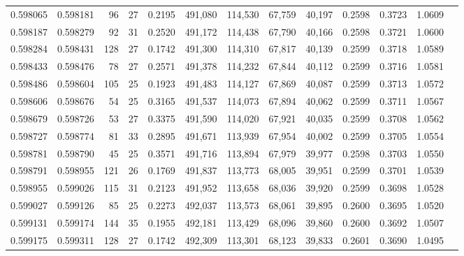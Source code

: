 \begin{tabular}{rrrrrrrrrrrrr}
0.598065 & 0.598181 &  96 &  27 &                                     0.2195 & 491,080 & 114,530 &  67,759 &  40,197 & 0.2598 & 0.3723 & 1.0609 \\
0.598187 & 0.598279 &  92 &  31 &                                     0.2520 & 491,172 & 114,438 &  67,790 &  40,166 & 0.2598 & 0.3721 & 1.0600 \\
0.598284 & 0.598431 & 128 &  27 &                                     0.1742 & 491,300 & 114,310 &  67,817 &  40,139 & 0.2599 & 0.3718 & 1.0589 \\
0.598433 & 0.598476 &  78 &  27 &                                     0.2571 & 491,378 & 114,232 &  67,844 &  40,112 & 0.2599 & 0.3716 & 1.0581 \\
0.598486 & 0.598604 & 105 &  25 &                                     0.1923 & 491,483 & 114,127 &  67,869 &  40,087 & 0.2599 & 0.3713 & 1.0572 \\
0.598606 & 0.598676 &  54 &  25 &                                     0.3165 & 491,537 & 114,073 &  67,894 &  40,062 & 0.2599 & 0.3711 & 1.0567 \\
0.598679 & 0.598726 &  53 &  27 &                                     0.3375 & 491,590 & 114,020 &  67,921 &  40,035 & 0.2599 & 0.3708 & 1.0562 \\
0.598727 & 0.598774 &  81 &  33 &                                     0.2895 & 491,671 & 113,939 &  67,954 &  40,002 & 0.2599 & 0.3705 & 1.0554 \\
0.598781 & 0.598790 &  45 &  25 &                                     0.3571 & 491,716 & 113,894 &  67,979 &  39,977 & 0.2598 & 0.3703 & 1.0550 \\
0.598791 & 0.598955 & 121 &  26 &                                     0.1769 & 491,837 & 113,773 &  68,005 &  39,951 & 0.2599 & 0.3701 & 1.0539 \\
0.598955 & 0.599026 & 115 &  31 &                                     0.2123 & 491,952 & 113,658 &  68,036 &  39,920 & 0.2599 & 0.3698 & 1.0528 \\
0.599027 & 0.599126 &  85 &  25 &                                     0.2273 & 492,037 & 113,573 &  68,061 &  39,895 & 0.2600 & 0.3695 & 1.0520 \\
0.599131 & 0.599174 & 144 &  35 &                                     0.1955 & 492,181 & 113,429 &  68,096 &  39,860 & 0.2600 & 0.3692 & 1.0507 \\
0.599175 & 0.599311 & 128 &  27 &                                     0.1742 & 492,309 & 113,301 &  68,123 &  39,833 & 0.2601 & 0.3690 & 1.0495 \\

\end{tabular}
